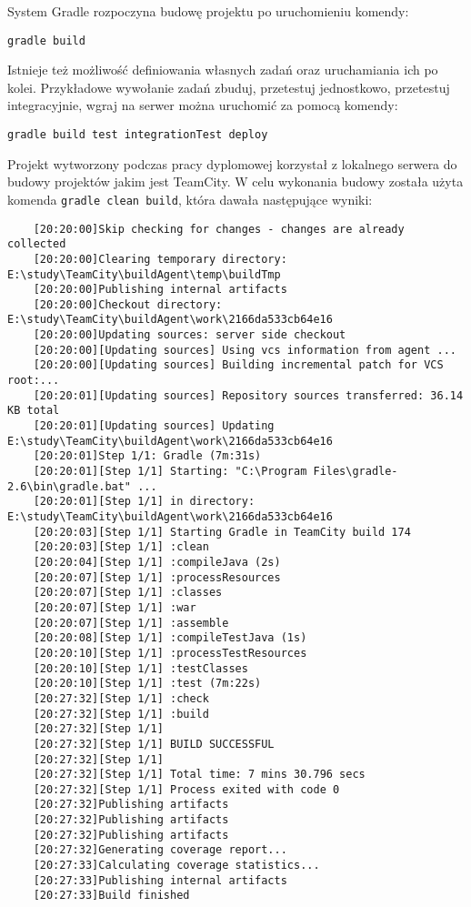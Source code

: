 System Gradle rozpoczyna budowę projektu po uruchomieniu komendy:

\verb|gradle build|

Istnieje też możliwość definiowania własnych zadań oraz uruchamiania ich po kolei. Przykładowe wywołanie zadań zbuduj, przetestuj jednostkowo, przetestuj integracyjnie, wgraj na serwer można uruchomić za pomocą komendy:


\verb|gradle build test integrationTest deploy|

Projekt wytworzony podczas pracy dyplomowej korzystał z lokalnego serwera do budowy projektów jakim jest TeamCity. W celu wykonania budowy została użyta komenda \verb|gradle clean build|, która dawała następujące wyniki:

\begin{verbatim}
	[20:20:00]Skip checking for changes - changes are already collected
	[20:20:00]Clearing temporary directory: E:\study\TeamCity\buildAgent\temp\buildTmp
	[20:20:00]Publishing internal artifacts
	[20:20:00]Checkout directory: E:\study\TeamCity\buildAgent\work\2166da533cb64e16
	[20:20:00]Updating sources: server side checkout
	[20:20:00][Updating sources] Using vcs information from agent ...
	[20:20:00][Updating sources] Building incremental patch for VCS root:...
	[20:20:01][Updating sources] Repository sources transferred: 36.14 KB total
	[20:20:01][Updating sources] Updating E:\study\TeamCity\buildAgent\work\2166da533cb64e16
	[20:20:01]Step 1/1: Gradle (7m:31s)
	[20:20:01][Step 1/1] Starting: "C:\Program Files\gradle-2.6\bin\gradle.bat" ...
	[20:20:01][Step 1/1] in directory: E:\study\TeamCity\buildAgent\work\2166da533cb64e16
	[20:20:03][Step 1/1] Starting Gradle in TeamCity build 174
	[20:20:03][Step 1/1] :clean
	[20:20:04][Step 1/1] :compileJava (2s)
	[20:20:07][Step 1/1] :processResources
	[20:20:07][Step 1/1] :classes
	[20:20:07][Step 1/1] :war
	[20:20:07][Step 1/1] :assemble
	[20:20:08][Step 1/1] :compileTestJava (1s)
	[20:20:10][Step 1/1] :processTestResources
	[20:20:10][Step 1/1] :testClasses
	[20:20:10][Step 1/1] :test (7m:22s)
	[20:27:32][Step 1/1] :check
	[20:27:32][Step 1/1] :build
	[20:27:32][Step 1/1] 
	[20:27:32][Step 1/1] BUILD SUCCESSFUL
	[20:27:32][Step 1/1] 
	[20:27:32][Step 1/1] Total time: 7 mins 30.796 secs
	[20:27:32][Step 1/1] Process exited with code 0
	[20:27:32]Publishing artifacts
	[20:27:32]Publishing artifacts
	[20:27:32]Publishing artifacts
	[20:27:32]Generating coverage report...
	[20:27:33]Calculating coverage statistics...
	[20:27:33]Publishing internal artifacts
	[20:27:33]Build finished
\end{verbatim}

